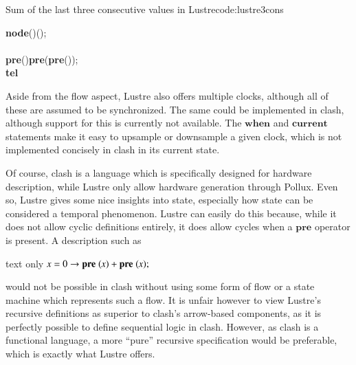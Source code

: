 \begin{texexptitled}{Sum of the last three consecutive values in Lustre}{code:lustre3cons}
\begin{hscode}\SaveRestoreHook
{}%
%
%
\>[B]{}\textbf{node}\;\;(\mathbin{:})\;\;(\mathbin{:});{}\<[E]%
\\
\>[B]{}\<[E]%
\\
\>[B]{}\<[5]%
\>[5]{}\mathrel{=}\textbf{pre}\;()\mathbin{+}\textbf{pre}\;(\textbf{pre}\;())\mathbin{+};{}\<[E]%
\\
\>[B]{}\textbf{tel}{}\<[E]%
\ColumnHook
\end{hscode}\resethooks
\end{texexptitled}

Aside from the flow aspect, Lustre also offers multiple clocks, although all of these are assumed to be synchronized. 
The same could be implemented in \gls{clash}, although support for this is currently not available. 
The \ensuremath{\textbf{when}} and \ensuremath{\textbf{current}} statements make it easy to upsample or downsample a given clock, which is not implemented concisely in \gls{clash} in its current state.

Of course, \gls{clash} is a language which is specifically designed for hardware description, while Lustre only allow hardware generation through Pollux.
Even so, Lustre gives some nice insights into state, especially how state can be considered a temporal phenomenon. 
Lustre can easily do this because, while it does not allow cyclic definitions entirely, it does allow cycles when a \ensuremath{\textbf{pre}} operator is present. 
A description such as \\
\begin{changemargin}{1cm}{0cm}
\begin{expansionno}{text only}
\ensuremath{\Varid{x}\mathrel{=}\mathrm{0}\to \textbf{pre}\;(\Varid{x})\mathbin{+}\textbf{pre}\;(\Varid{x});}
\end{expansionno}
\end{changemargin}
would not be possible in \gls{clash} without using some form of flow or a state machine which represents such a flow.
It is unfair however to view Lustre's recursive definitions as superior to \gls{clash}'s arrow-based components, as it is perfectly possible to define sequential logic in \gls{clash}. 
However, as \gls{clash} is a functional language, a more ``pure'' recursive specification would be preferable, which is exactly what Lustre offers.

